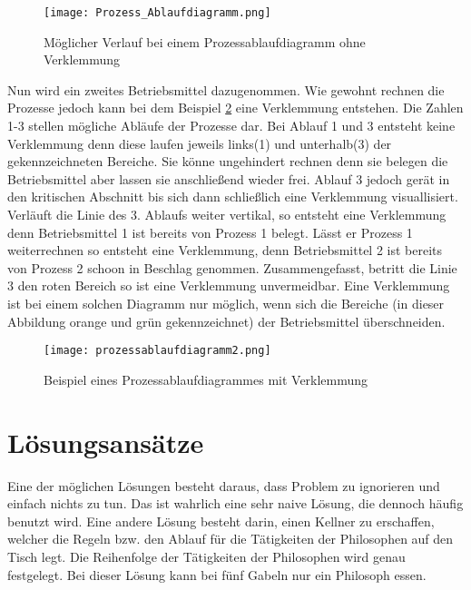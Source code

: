 \begin{figure}[H]
\caption{Möglicher Verlauf bei einem Prozessablaufdiagramm ohne Verklemmung}
\label{fig:normales_Ablaufdiagramm}
\centering
\texttt{[image: Prozess\_Ablaufdiagramm.png]}
\end{figure}

Nun wird ein zweites Betriebsmittel dazugenommen. Wie gewohnt rechnen die Prozesse jedoch kann bei dem Beispiel \ref{fig:verklemmtes_ablaufdiagramm} eine Verklemmung entstehen. Die Zahlen 1-3 stellen mögliche Abläufe der Prozesse dar. Bei Ablauf 1 und 3 entsteht keine Verklemmung denn diese laufen jeweils links(1) und unterhalb(3) der gekennzeichneten Bereiche. Sie könne ungehindert rechnen denn sie belegen die Betriebsmittel aber lassen sie anschließend wieder frei. Ablauf 3 jedoch gerät in den kritischen Abschnitt bis sich dann schließlich eine Verklemmung visuallisiert. Verläuft die Linie des 3. Ablaufs weiter vertikal, so entsteht eine Verklemmung denn Betriebsmittel 1 ist bereits von Prozess 1 belegt. Lässt er Prozess 1 weiterrechnen so entsteht eine Verklemmung, denn Betriebsmittel 2 ist bereits von Prozess 2 schoon in Beschlag genommen. Zusammengefasst, betritt die Linie 3 den roten Bereich so ist eine Verklemmung unvermeidbar.
Eine Verklemmung ist bei einem solchen Diagramm nur möglich, wenn sich die Bereiche (in dieser Abbildung orange und grün gekennzeichnet) der Betriebsmittel überschneiden.

\begin{figure}[H]
\caption{Beispiel eines Prozessablaufdiagrammes mit Verklemmung}
\label{fig:verklemmtes_ablaufdiagramm}
\centering
\texttt{[image: prozessablaufdiagramm2.png]}
\end{figure}

\section{Lösungsansätze}
\label{lösung}

Eine der möglichen Lösungen besteht daraus, dass Problem zu ignorieren und einfach nichts zu tun. Das ist wahrlich eine sehr naive Lösung, die dennoch häufig benutzt wird. 
Eine andere Lösung besteht darin, einen Kellner zu erschaffen, welcher die Regeln bzw. den Ablauf für die Tätigkeiten der Philosophen auf den Tisch legt. Die Reihenfolge der Tätigkeiten der Philosophen wird genau festgelegt. Bei dieser Lösung kann bei fünf Gabeln nur ein Philosoph essen.\parencite[vgl.][S.220]{tanenbaum2016}

